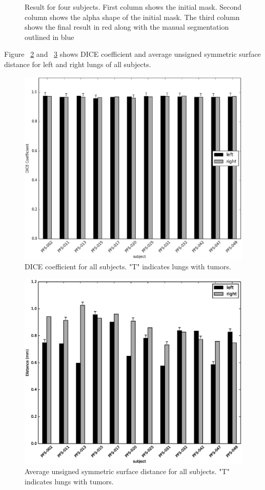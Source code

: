 \documentclass{llncs}
\begin{document}
\begin{figure}[t]
  \caption{Result for four subjects. First column shows the initial mask. Second column shows the alpha shape of the initial mask. The third column shows the final result in red along with the manual segmentation outlined in blue}
  \label{fig:resultseg}
\end{figure}

Figure ~\ref{fig:dice} and ~\ref{fig:dist} shows DICE coefficient and average unsigned symmetric surface distance for left and right lungs of all subjects.
\begin{figure}[t]
  \centering
    \includegraphics[width=4.5in]{figs/dice}
  \caption{DICE coefficient for all subjects. "T" indicates lungs with tumors.}
  \label{fig:dice}
\end{figure}

\begin{figure}[t]
  \centering
    \includegraphics[width=4.5in]{figs/distUnsignSym}
  \caption{Average unsigned symmetric surface distance for all subjects. "T" indicates lungs with tumors.}
  \label{fig:dist}
\end{figure}
\end{document}
